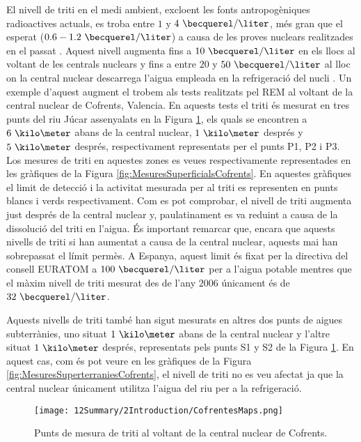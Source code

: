 El nivell de triti en el medi ambient, excloent les fonts antropogèniques radioactives actuals, es troba entre $1$ y $4~\becquerel/\liter$, més gran que el esperat ($0.6-1.2~\becquerel/\liter$) a causa de les proves nuclears realitzades en el passat \cite{FranceTritiumEnvironment}. Aquest nivell augmenta fins a $10~\becquerel/\liter$ en els llocs al voltant de les centrals nuclears y fins a entre $20$ y $50~\becquerel/\liter$ al lloc on la central nuclear descarrega l'aigua empleada en la refrigeració del nucli \cite{FranceTritiumEnvironment}. Un exemple d'aquest augment el trobem als tests realitzats pel REM al voltant de la central nuclear de Cofrents, Valencia. En aquests tests el triti és mesurat en tres punts del riu Júcar assenyalats en la Figura \ref{fig:PuntsMesuraTritiCofrents}, els quals se encontren a $6~\kilo\meter$ abans de la central nuclear, $1~\kilo\meter$ després y $5~\kilo\meter$ després, respectivament representats per el punts P1, P2 i P3. Los mesures de triti en aquestes zones es veues respectivamente representades en les gràfiques de la Figura \ref{fig:MesuresSuperficialsCofrents}. En aquestes gràfiques el limit de detecció i la activitat mesurada per al triti es representen en punts blancs i verds respectivament. Com es pot comprobar, el nivell de triti augmenta just després de la central nuclear y, paulatinament es va reduint a causa de la dissolució del triti en l'aigua. És important remarcar que, encara que aquests nivells de triti si han aumentat a causa de la central nuclear, aquests mai han sobrepassat el límit permès. A Espanya, aquest limit és fixat per la directiva del consell EURATOM a $100~\becquerel/\liter$ per a l'aigua potable \cite{100BqL} mentres que el màxim nivell de triti mesurat des de l'any $2006$ únicament és de $32~\becquerel/\liter$.

Aquests nivells de triti també han sigut mesurats en altres dos punts de aigues subterrànies, uno situat $1~\kilo\meter$ abans de la central nuclear y l'altre situat $1~\kilo\meter$ després, representats pels punts S1 y S2 de la Figura \ref{fig:PuntsMesuraTritiCofrents}. En aquest cas, com és pot veure en les gràfiques de la Figura \ref{fig:MesuresSuperterraniesCofrents}, el nivell de triti no es veu afectat ja que la central nuclear únicament utilitza l'aigua del riu per a la refrigeració.

\begin{figure}[hbtp]
\texttt{[image: 12Summary/2Introduction/CofrentesMaps.png]}
\centering
\caption{Punts de mesura de triti al voltant de la central nuclear de Cofrents.\label{fig:PuntsMesuraTritiCofrents}}
\end{figure}

